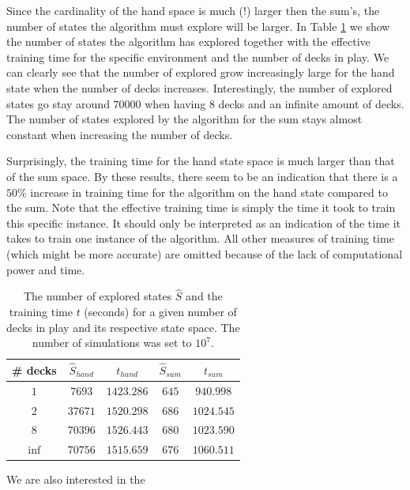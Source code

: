 Since the cardinality of the hand space is much (!) larger then the sum's, the number of states the algorithm must explore will be larger. In Table \ref{tab:state_visited} we show the number of states the algorithm has explored together with the effective training time for the specific environment and the number of decks in play. We can clearly see that the number of explored grow increasingly large for the hand state when the number of decks increases. Interestingly, the number of explored states go stay around $70 000$ when having 8 decks and an infinite amount of decks. The number of states explored by the algorithm for the sum stays almost constant when increasing the number of decks.

Surprisingly, the training time for the hand state space is much larger than that of the sum space. By these results, there seem to be an indication that there is a $50\%$ increase in training time for the algorithm on the hand state compared to the sum. Note that the effective training time is simply the time it took to train this specific instance. It should only be interpreted as an indication of the time it takes to train one instance of the algorithm. All other measures of training time (which might be more accurate) are omitted because of the lack of computational power and time.
\begin{table}[h!]
\centering
 \begin{tabular}{c|cc|cc}
  \# decks & $\hat{S}_{hand}$ & $t_{hand}$ & $\hat{S}_{sum}$ &  $t_{sum}$  \\
  \hline 
  $1$ & $7693$ & $1423.286$ & $645$ & $940.998$ \\
  $2$ & $37671$ & $1520.298$ & $686$ & $1024.545$ \\
  $8$ & $70396$ & $1526.443$ & $680$ & $1023.590$ \\
  $\inf$ & $70756$ & $1515.659$ & $676$ & $1060.511$ 
 \end{tabular} 
 \caption{The number of explored states $\hat{S}$ and the training time $t$ (seconds) for a given number of decks in play and its respective state space. The number of simulations was set to $10^7$.\label{tab:state_visited}}
\end{table}

We are also interested in the 


